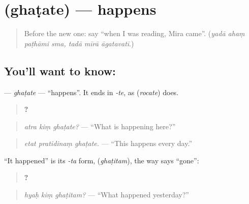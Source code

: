 \section[\texorpdfstring{\sk{घटते} (ghaṭate)}{घटते (ghaṭate)}]{ (ghaṭate) — happens}

\label{lesson:SA-C276-ghatate}



\begin{quote}
Before the new one: say \textquotedblleft{}when I was reading, Mira came\textquotedblright{}. (\emph{yadā ahaṃ paṭhāmi sma, tadā mīrā āgatavatī}.)
\end{quote}

\subsection*{You'll want to know: }
\textbf{} — \emph{ghaṭate} — \textquotedblleft{}happens\textquotedblright{}. It ends in \emph{-te}, as \textbf{} (\emph{rocate}) does.

\begin{quote}
\textbf{  ?}
\end{quote}

\begin{quote}
\emph{atra kiṃ ghaṭate?} — \textquotedblleft{}What is happening here?\textquotedblright{}
\end{quote}

\begin{quote}
\textbf{  }
\end{quote}

\begin{quote}
\emph{etat pratidinaṃ ghaṭate.} — \textquotedblleft{}This happens every day.\textquotedblright{}
\end{quote}

\textquotedblleft{}It happened\textquotedblright{} is its \emph{-ta} form, \textbf{} (\emph{ghaṭitam}), the way \textbf{} says \textquotedblleft{}gone\textquotedblright{}:

\begin{quote}
\textbf{  ?}
\end{quote}

\begin{quote}
\emph{hyaḥ kiṃ ghaṭitam?} — \textquotedblleft{}What happened yesterday?\textquotedblright{}
\end{quote}

